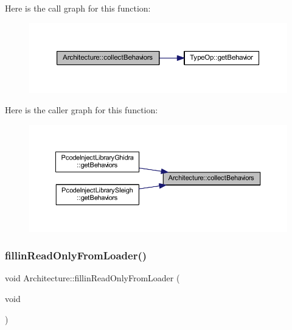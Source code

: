 Here is the call graph for this function\+:
\nopagebreak
\begin{figure}[H]
\begin{center}
\leavevmode
\includegraphics[width=350pt]{class_architecture_a5499f02b08260cd95354143546fd374b_cgraph}
\end{center}
\end{figure}
Here is the caller graph for this function\+:
\nopagebreak
\begin{figure}[H]
\begin{center}
\leavevmode
\includegraphics[width=350pt]{class_architecture_a5499f02b08260cd95354143546fd374b_icgraph}
\end{center}
\end{figure}
\mbox{\label{class_architecture_a74b374a6d9b25a638567c3519ac1796c}} 
\subsubsection{\texorpdfstring{fillinReadOnlyFromLoader()}{fillinReadOnlyFromLoader()}}
{\footnotesize\ttfamily void Architecture\+::fillin\+Read\+Only\+From\+Loader (\begin{DoxyParamCaption}\item[{void}]{ }\end{DoxyParamCaption})\hspace{0.3cm}{\ttfamily [protected]}}



